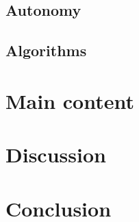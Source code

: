 \documentclass[conference]{IEEEtran}
\begin{document}
 \subsection{Autonomy}
 \subsection{Algorithms}

\section{Main content} %


\section{Discussion}

\section{Conclusion}


\end{document}
